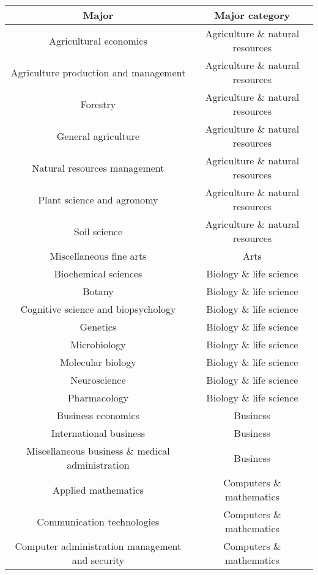 \documentclass[11pt]{article}
\begin{document}
\begin{center}
    \begin{longtable} {|| c c ||}
    \hline
    Major & Major category \\ [0.5ex]
    \hline\hline

    Agricultural economics & Agriculture \& natural resources \\
    \hline
    Agriculture production and management & Agriculture \& natural resources \\
    \hline
    Forestry & Agriculture \& natural resources \\
    \hline
    General agriculture & Agriculture \& natural resources \\
    \hline
    Natural resources management & Agriculture \& natural resources \\
    \hline
    Plant science and agronomy & Agriculture \& natural resources \\
    \hline
    Soil science & Agriculture \& natural resources \\
    \hline
    Miscellaneous fine arts & Arts \\
    \hline
    Biochemical sciences & Biology \& life science \\
    \hline
    Botany & Biology \& life science \\
    \hline
    Cognitive science and biopsychology & Biology \& life science \\
    \hline
    Genetics & Biology \& life science \\
    \hline
    Microbiology & Biology \& life science \\
    \hline
    Molecular biology & Biology \& life science \\
    \hline
    Neuroscience & Biology \& life science \\
    \hline
    Pharmacology & Biology \& life science \\
    \hline
    Business economics & Business \\
    \hline
    International business & Business \\
    \hline
    Miscellaneous business \& medical administration & Business \\
    \hline
    Applied mathematics & Computers \& mathematics \\
    \hline
    Communication technologies & Computers \& mathematics \\
    \hline
    Computer administration management and security & Computers \& mathematics \\

\end{longtable}
\end{center}
\end{document}
